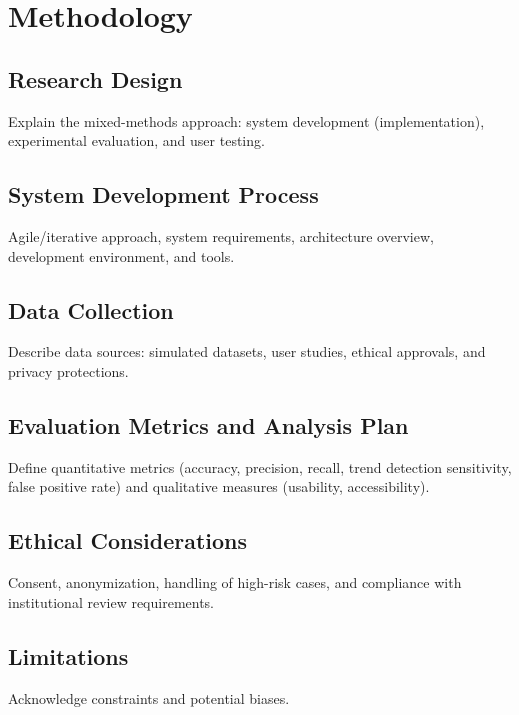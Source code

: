 \chapter{Methodology}
\label{ch:method}

\section{Research Design}
\noindent Explain the mixed-methods approach: system development (implementation), experimental evaluation, and user testing.

\section{System Development Process}
\noindent Agile/iterative approach, system requirements, architecture overview, development environment, and tools.

\section{Data Collection}
\noindent Describe data sources: simulated datasets, user studies, ethical approvals, and privacy protections.

\section{Evaluation Metrics and Analysis Plan}
\noindent Define quantitative metrics (accuracy, precision, recall, trend detection sensitivity, false positive rate) and qualitative measures (usability, accessibility).

\section{Ethical Considerations}
\noindent Consent, anonymization, handling of high-risk cases, and compliance with institutional review requirements.

\section{Limitations}
\noindent Acknowledge constraints and potential biases.
